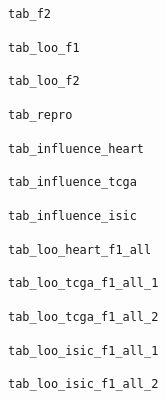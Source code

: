 \documentclass[10pt]{article}
\begin{document}
\begin{table}[p]\centering\small
\caption{\texttt{tab\_f2}}
\resizebox{\linewidth}{!}{}
\end{table}
\begin{table}[p]\centering\small
\caption{\texttt{tab\_loo\_f1}}
\resizebox{\linewidth}{!}{}
\end{table}
\begin{table}[p]\centering\small
\caption{\texttt{tab\_loo\_f2}}
\resizebox{\linewidth}{!}{}
\end{table}
\begin{table}[p]\centering\small
\caption{\texttt{tab\_repro}}
\resizebox{\linewidth}{!}{}
\end{table}
\begin{table}[p]\centering\small
\caption{\texttt{tab\_influence\_heart}}
\resizebox{\linewidth}{!}{}
\end{table}
\begin{table}[p]\centering\small
\caption{\texttt{tab\_influence\_tcga}}
\resizebox{\linewidth}{!}{}
\end{table}
\begin{table}[p]\centering\small
\caption{\texttt{tab\_influence\_isic}}
\resizebox{\linewidth}{!}{}
\end{table}
\begin{table}[p]\centering\small
\caption{\texttt{tab\_loo\_heart\_f1\_all}}
\resizebox{\linewidth}{!}{}
\end{table}
\begin{table}[p]\centering\small
\caption{\texttt{tab\_loo\_tcga\_f1\_all\_1}}
\resizebox{\linewidth}{!}{}
\end{table}
\begin{table}[p]\centering\small
\caption{\texttt{tab\_loo\_tcga\_f1\_all\_2}}
\resizebox{\linewidth}{!}{}
\end{table}
\begin{table}[p]\centering\small
\caption{\texttt{tab\_loo\_isic\_f1\_all\_1}}
\resizebox{\linewidth}{!}{}
\end{table}
\begin{table}[p]\centering\small
\caption{\texttt{tab\_loo\_isic\_f1\_all\_2}}
\resizebox{\linewidth}{!}{}
\end{table}
\end{document}
